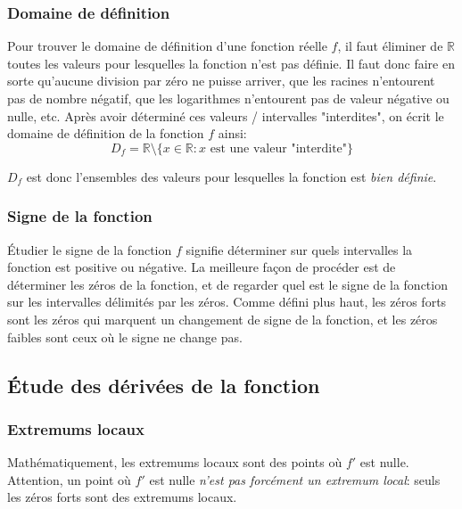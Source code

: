 \documentclass{article}
\begin{document}
\subsubsection{Domaine de définition}
Pour trouver le domaine de définition d'une fonction réelle \(f\), il faut éliminer de \(\mathbb{R}\) toutes les valeurs pour lesquelles la fonction n'est pas définie. Il faut donc faire en sorte qu'aucune division par zéro ne puisse arriver, que les racines n'entourent pas de nombre négatif, que les logarithmes n'entourent pas de valeur négative ou nulle, etc. Après avoir déterminé ces valeurs / intervalles "interdites", on écrit le domaine de définition de la fonction \(f\) ainsi:
\begin{equation*}
	D_f = \mathbb{R} \setminus \{ x \in \mathbb{R} : x \text{ est une valeur "interdite"} \}
\end{equation*}

\(D_f\) est donc l'ensembles des valeurs pour lesquelles la fonction est \emph{bien définie}.

\subsubsection{Signe de la fonction}
Étudier le signe de la fonction \(f\) signifie déterminer sur quels intervalles la fonction est positive ou négative. La meilleure façon de procéder est de déterminer les zéros de la fonction, et de regarder quel est le signe de la fonction sur les intervalles délimités par les zéros. Comme défini plus haut, les zéros forts sont les zéros qui marquent un changement de signe de la fonction, et les zéros faibles sont ceux où le signe ne change pas.

\subsection{Étude des dérivées de la fonction}

\subsubsection{Extremums locaux}
Mathématiquement, les extremums locaux sont des points où \(f'\) est nulle. Attention, un point où \(f'\) est nulle \emph{n'est pas forcément un extremum local}: seuls les zéros forts sont des extremums locaux. \\
\end{document}
